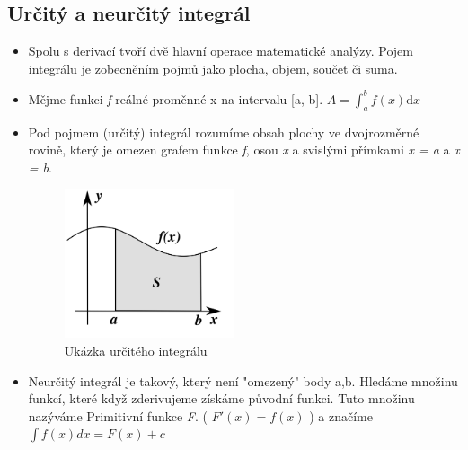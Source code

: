 \documentclass[10pt,a4paper]{article}
\begin{document}
\subsection{Určitý a neurčitý integrál}
\begin{itemize}
\item Spolu s derivací tvoří dvě hlavní operace matematické analýzy. Pojem integrálu je zobecněním pojmů jako plocha, objem, součet či suma.
\item Mějme funkci \textit{f} reálné proměnné x na intervalu [a, b]. $\displaystyle A = \int_a^b f(x) \mathrm{d}x$
\item Pod pojmem (určitý) integrál rozumíme obsah plochy ve dvojrozměrné rovině, který je omezen grafem funkce \textit{f}, osou \textit{x} a svislými přímkami \textit{x = a} a \textit{x = b}.
\begin{figure}[ht]
    \centering
    \includegraphics[width = 5cm]{Integral_as_region_under_curve.png}
    \caption{Ukázka určitého integrálu}
    \label{fig:Integral_as_region_under_curve}
\end{figure}
\item Neurčitý integrál je takový, který není "omezený" body a,b. Hledáme množinu funkcí, které když zderivujeme získáme původní funkci. Tuto množinu nazýváme Primitivní funkce \textit{F}. ( $\displaystyle F'(x) = f(x)$ ) a značíme $\displaystyle \int f(x)dx = F(x)+c$ 
\end{itemize}
\end{document}
